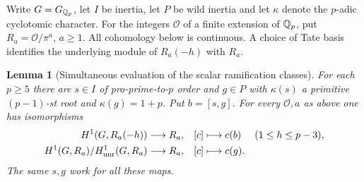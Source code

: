 \documentclass[a4paper,11pt]{article}
\newtheorem{lemma}[proposition]{Lemma}
\theoremstyle{definition}
\theoremstyle{remark}
\numberwithin{equation}{section}
\begin{document}
Write \(G=G_{\mathbb Q_p}\), let \(I\) be inertia, let \(P\) be wild
inertia and let \(\kappa\) denote the \(p\)-adic cyclotomic
character. For the integers \(\mathcal O\) of a finite extension
of \(\mathbb Q_p\), put \(R_a=\mathcal O/\pi^a\), \(a\ge1\). All
cohomology below is continuous. A choice of Tate basis identifies
the underlying module of \(R_a(-h)\) with \(R_a\).

\begin{lemma}[Simultaneous evaluation of the scalar ramification classes]
\leavevmode\label{lem:wildgenerators745}
For each \(p\ge5\) there are \(s\in I\) of pro-prime-to-\(p\)
order and \(g\in P\) with \(\kappa(s)\) a primitive
\((p-1)\)-st root and \(\kappa(g)=1+p\). Put \(b=[s,g]\).
For every \(\mathcal O,a\) as above one has isomorphisms
\[
 \begin{aligned}
 H^1(G,R_a(-h))&\longrightarrow R_a,& [c]&\longmapsto c(b)
                          &&(1\le h\le p-3),\\
 H^1(G,R_a)/H^1_{\rm unr}(G,R_a)&\longrightarrow R_a,
                & [c]&\longmapsto c(g).&&
 \end{aligned}
\]
The same \(s,g\) work for all these maps.
\end{lemma}
\end{document}
